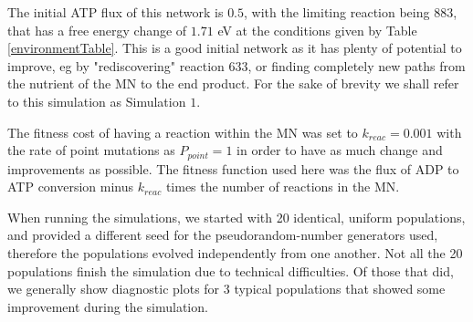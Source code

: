 \documentclass[10pt,a4paper]{article}
\begin{document}
The initial ATP flux of this network is $0.5$, with the limiting reaction being $883$, that has a free energy change of $1.71$ eV at the conditions given by Table \ref{environmentTable}. This is a good initial network as it has plenty of potential to improve, eg by "rediscovering" reaction $633$, or finding completely new paths from the nutrient of the MN to the end product. For the sake of brevity we shall refer to this simulation as Simulation $1$.

The fitness cost of having a reaction within the MN was set to $k_{reac}=0.001$ with the rate of point mutations as $P_{point}=1$ in order to have as much change and improvements as possible. The fitness function used here was the flux of ADP to ATP conversion minus $k_{reac}$ times the number of reactions in the MN.

When running the simulations, we started with 20 identical, uniform populations, and provided a different seed for the pseudorandom-number generators used, therefore the populations evolved independently from one another. Not all the 20 populations finish the simulation due to technical difficulties. Of those that did, we generally show diagnostic plots for 3 typical populations that showed some improvement during the simulation.
\end{document}
